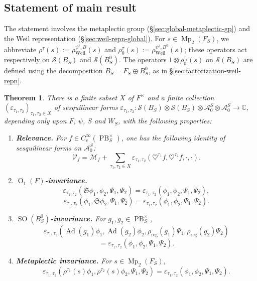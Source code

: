 \documentclass[reqno,10pt]{amsart}
\theoremstyle{plain} %
\newtheorem{theorem}             {Theorem}
\theoremstyle{definition}
\theoremstyle{plain} %
\theoremstyle{remark}
\theoremstyle{itplain} %
\theoremstyle{remark} %
\numberwithin{equation}{section}
\DeclareMathOperator{\Mp}{Mp}
\DeclareMathOperator{\SO}{SO}
\DeclareMathOperator{\Ad}{Ad}
\def\eps{\varepsilon}
\def\PB{\operatorname{PB}}
\DeclareMathOperator{\Weil}{Weil}
\def\O{\operatorname{O}}
\DeclareMathOperator{\reg}{reg}
\begin{document}
\subsection{Statement of main result}
\label{sec-4-3}
The statement involves the metaplectic group (\S\ref{sec:global-metaplectic-gp}) and the Weil representation (\S\ref{sec:weil-repn-global}).  For $s \in \Mp_2(F_S)$, we abbreviate $\rho^{\tau}(s) := \rho_{\Weil}^{\psi^{\tau},B}(s)$ and $\rho_0^\tau(s) := \rho_{\Weil}^{\psi^{\tau},B^0}(s)$; these operators act respectively on $\mathcal{S}(B_S)$ and $\mathcal{S}(B_S^0)$.  The operators $1 \otimes \rho_0^{\tau_i}(s)$ on $\mathcal{S}(B_S)$ are defined using the decomposition $B_S = F_S \oplus B_S^0$, as in \S\ref{sec:factorization-weil-repn}.
\begin{theorem}\label{thm:main-estimate-general-variance}
  There is a finite subset $X$ of $F^\times$ and a finite collection $(\eps_{\tau_1,\tau_2})_{\tau_1,\tau_2 \in X}$ of sesquilinear forms $\eps_{\tau_1,\tau_2} : \mathcal{S}(B_S) \otimes \mathcal{S}(B_S) \otimes \mathcal{A}_0^S \otimes \mathcal{A}_0^S \rightarrow \mathbb{C}$, depending only upon $F$, $\psi$, $S$ and $W_S$, with the following properties:
  \begin{enumerate}
  \item {\bf Relevance.}  For $f \in C_c^\infty(\PB^\times_S)$, one has the following identity of sesquilinear forms on $\mathcal{A}_0^S$:
    \begin{equation}\label{eq:relevance}
      \mathcal{V}_f
      = \mathcal{M}_f
      + \sum_{\tau_1,\tau_2 \in X} \eps_{\tau_1,\tau_2}(\heartsuit^{\tau_1} f, \heartsuit^{\tau_2} f, \cdot, \cdot).
    \end{equation}
  \item {\bf $\O_1(F)$-invariance.}
    \[
      \eps_{\tau_1,\tau_2}(\mathfrak{S} \phi_1, \phi_2, \Psi_1, \Psi_2) = \eps_{\tau_1,\tau_2}( \phi_1, \phi_2, \Psi_1, \Psi_2),
    \]
    \[
      \eps_{\tau_1,\tau_2}(\phi_1, \mathfrak{S}\phi_2, \Psi_1, \Psi_2) = \eps_{\tau_1,\tau_2}(\phi_1, \phi_2, \Psi_1, \Psi_2).
    \]
    
  \item {\bf $\SO(B_S^0)$-invariance.}  For $g_1,g_2 \in \PB^\times_S$,
    \[\eps_{\tau_1,\tau_2}(\Ad(g_1) \phi_1, \Ad(g_2) \phi_2, \rho_{\reg}(g_1) \Psi_1,
      \rho_{\reg}(g_2) \Psi_2)
    \]
    \[
      = \eps_{\tau_1,\tau_2}(\phi_1, \phi_2, \Psi_1, \Psi_2).
    \]
  \item {\bf Metaplectic invariance.}  For $s \in \Mp_2(F_S)$,
    \[
      \eps_{\tau_1,\tau_2}(\rho^{\tau_1}(s) \phi_1, \rho^{\tau_2}(s) \phi_2, \Psi_1, \Psi_2) = \eps_{\tau_1,\tau_2}(\phi_1, \phi_2, \Psi_1, \Psi_2).
    \]
    

\end{enumerate}
\end{theorem}
\end{document}
